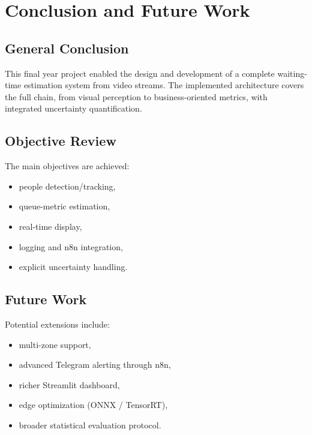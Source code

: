 \chapter{Conclusion and Future Work}
\chaptertoc

\section{General Conclusion}
This final year project enabled the design and development of a complete waiting-time estimation system from video streams.
The implemented architecture covers the full chain, from visual perception to business-oriented metrics, with integrated uncertainty quantification.

\section{Objective Review}
The main objectives are achieved:
\begin{itemize}
    \item people detection/tracking,
    \item queue-metric estimation,
    \item real-time display,
    \item logging and n8n integration,
    \item explicit uncertainty handling\cite{bishop_prml,bytetrack2022}.
\end{itemize}

\section{Future Work}
Potential extensions include:
\begin{itemize}
    \item multi-zone support,
    \item advanced Telegram alerting through n8n,
    \item richer Streamlit dashboard,
    \item edge optimization (ONNX / TensorRT),
    \item broader statistical evaluation protocol.
\end{itemize}
